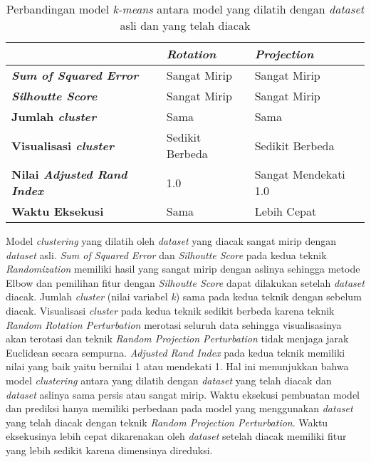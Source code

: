 \begin{table}
	\centering
	\caption{Perbandingan model \textit{k-means} antara model yang dilatih dengan \textit{dataset} asli dan yang telah diacak}
	\begin{tabular}{|l|l|l|}
		\hline
		& \textbf{\textit{Rotation}} & \textbf{\textit{Projection}} \\ \hline
		\textbf{\textit{Sum of Squared Error}} & Sangat Mirip & Sangat Mirip \\
		\textbf{\textit{Silhoutte Score}} & Sangat Mirip & Sangat Mirip \\
		\textbf{Jumlah \textit{cluster}} & Sama & Sama \\
		\textbf{Visualisasi \textit{cluster}} & Sedikit Berbeda & Sedikit Berbeda \\
		\textbf{Nilai \textit{Adjusted Rand Index}} & 1.0 & Sangat Mendekati 1.0 \\
		\textbf{Waktu Eksekusi} & Sama & Lebih Cepat \\
		\hline
	\end{tabular}
	\label{table:perbandingan-clustering}
\end{table}

Model \textit{clustering} yang dilatih oleh \textit{dataset} yang diacak sangat mirip dengan \textit{dataset} asli. \textit{Sum of Squared Error} dan \textit{Silhoutte Score} pada kedua teknik \textit{Randomization} memiliki hasil yang sangat mirip dengan aslinya sehingga metode Elbow dan pemilihan fitur dengan \textit{Silhoutte Score} dapat dilakukan setelah \textit{dataset} diacak. Jumlah \textit{cluster} (nilai variabel \textit{k}) sama pada kedua teknik dengan sebelum diacak. Visualisasi \textit{cluster} pada kedua teknik sedikit berbeda karena teknik \textit{Random Rotation Perturbation} merotasi seluruh data sehingga visualisasinya akan terotasi dan teknik \textit{Random Projection Perturbation} tidak menjaga jarak Euclidean secara sempurna. \textit{Adjusted Rand Index} pada kedua teknik memiliki nilai yang baik yaitu bernilai 1 atau mendekati 1. Hal ini menunjukkan bahwa model \textit{clustering} antara yang dilatih dengan \textit{dataset} yang telah diacak dan \textit{dataset} aslinya sama persis atau sangat mirip. Waktu eksekusi pembuatan model dan prediksi hanya memiliki perbedaan pada model yang menggunakan \textit{dataset} yang telah diacak dengan teknik \textit{Random Projection Perturbation}. Waktu eksekusinya lebih cepat dikarenakan oleh \textit{dataset} setelah diacak memiliki fitur yang lebih sedikit karena dimensinya direduksi.

